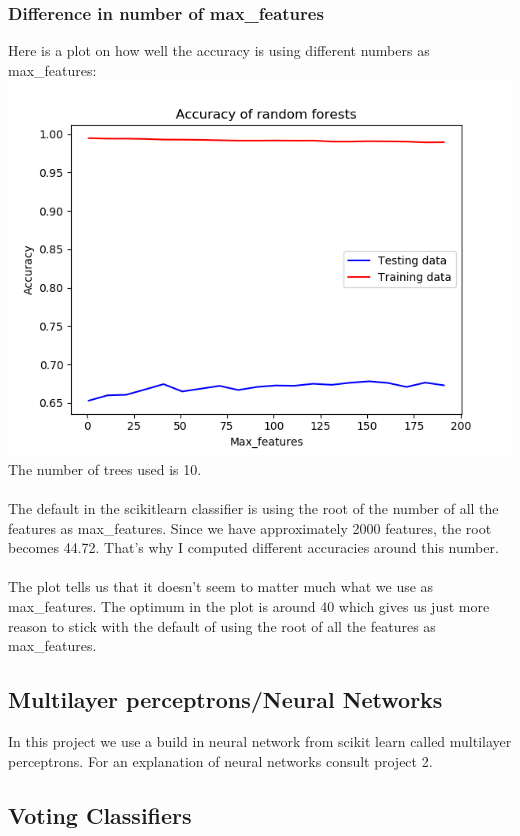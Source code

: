 \documentclass[parskip=half]{scrartcl}
\theoremstyle{definition}
\theoremstyle{remark}
\begin{document}
\subsubsection{Difference in number of max\_features}
Here is a plot on how well the accuracy is using different numbers as max\_features:\\
\includegraphics[scale=.7]{images/Max_featuresplot}\\
The number of trees used is 10.\\
\\
The default in the scikitlearn classifier is using the root of the number of all the features as max\_features. Since we have approximately 2000 features, the root becomes 44.72. That's why I computed different accuracies around this number.\\
\\
The plot tells us that it doesn't seem to matter much what we use as max\_features. The optimum in the plot is around 40 which gives us just more reason to stick with the default of using the root of all the features as max\_features.

\subsection{Multilayer perceptrons/Neural Networks}
In this project we use a build in neural network from scikit learn called multilayer perceptrons.
For an explanation of neural networks consult project 2.


\subsection{Voting Classifiers}
\end{document}

